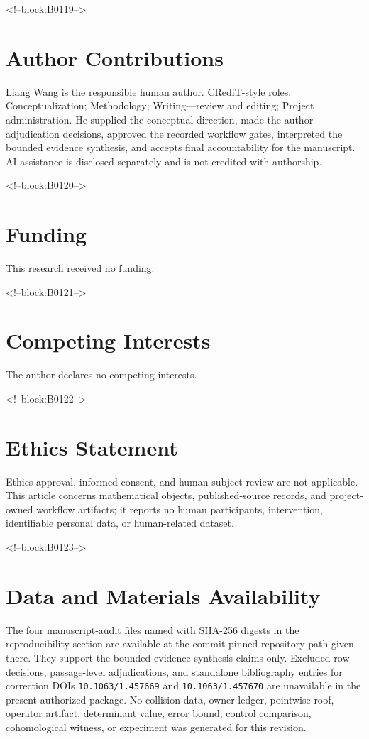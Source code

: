 \documentclass[11pt,a4paper]{article}
\begin{document}
<!--block:B0119-->
\section*{Author Contributions}
Liang Wang is the responsible human author. CRediT-style roles: Conceptualization; Methodology; Writing---review and editing; Project administration. He supplied the conceptual direction, made the author-adjudication decisions, approved the recorded workflow gates, interpreted the bounded evidence synthesis, and accepts final accountability for the manuscript. AI assistance is disclosed separately and is not credited with authorship.

<!--block:B0120-->
\section*{Funding}
This research received no funding.

<!--block:B0121-->
\section*{Competing Interests}
The author declares no competing interests.

<!--block:B0122-->
\section*{Ethics Statement}
Ethics approval, informed consent, and human-subject review are not applicable. This article concerns mathematical objects, published-source records, and project-owned workflow artifacts; it reports no human participants, intervention, identifiable personal data, or human-related dataset.

<!--block:B0123-->
\section*{Data and Materials Availability}
The four manuscript-audit files named with SHA-256 digests in the reproducibility section are available at the commit-pinned repository path given there. They support the bounded evidence-synthesis claims only. Excluded-row decisions, passage-level adjudications, and standalone bibliography entries for correction DOIs \texttt{10.1063/1.457669} and \texttt{10.1063/1.457670} are unavailable in the present authorized package. No collision data, owner ledger, pointwise roof, operator artifact, determinant value, error bound, control comparison, cohomological witness, or experiment was generated for this revision.
\end{document}
